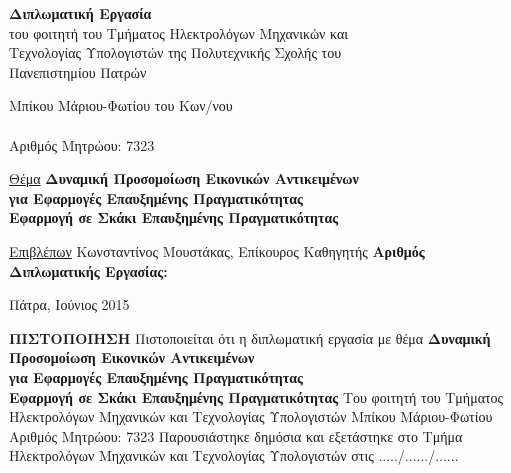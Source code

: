 \begin{center}
\LARGE\textbf{Διπλωματική Εργασία}\\
\Large
του φοιτητή του Τμήματος Ηλεκτρολόγων Μηχανικών και\\
Τεχνολογίας Υπολογιστών της Πολυτεχνικής Σχολής του\\
Πανεπιστημίου Πατρών
\end{center}
\vskip0.5cm
\begin{center}
\LARGE
Μπίκου Μάριου-Φωτίου του Κων/νου\\
~~\\
Αριθμός Μητρώου: 7323
\end{center}

\vskip1cm
\begin{center}
\LARGE
\underline{Θέμα}
\vskip0.3cm
\textbf{Δυναμική Προσομοίωση Εικονικών Αντικειμένων \\ για Εφαρμογές Επαυξημένης Πραγματικότητας}
\\
\Large 
\textbf{Εφαρμογή σε Σκάκι Επαυξημένης Πραγματικότητας}

\end{center}

\vskip1cm
\begin{center}
\Large
\underline{Επιβλέπων}
\vskip0.2cm
Κωνσταντίνος Μουστάκας, Επίκουρος Καθηγητής
\vskip1cm
\textbf{Αριθμός Διπλωματικής Εργασίας:}
\end{center}
\vfill
\centerline{
\Large Πάτρα, Ιούνιος 2015
}
\clearpage
\null\clearpage %



\begin{center}
\LARGE
\textbf{ΠΙΣΤΟΠΟΙΗΣΗ}
\vskip0.5cm
Πιστοποιείται ότι η διπλωματική εργασία με θέμα
\vskip0.5cm
\textbf{Δυναμική Προσομοίωση Εικονικών Αντικειμένων \\ για Εφαρμογές Επαυξημένης Πραγματικότητας}
\\
\Large 
\textbf{Εφαρμογή σε Σκάκι Επαυξημένης Πραγματικότητας
}
\vskip2cm
\Large
Του φοιτητή του Τμήματος Ηλεκτρολόγων Μηχανικών και Τεχνολογίας Υπολογιστών
\vskip1cm
Μπίκου Μάριου-Φωτίου\\
\vskip0.5cm
Αριθμός Μητρώου: 7323
\vskip2cm
Παρουσιάστηκε δημόσια και εξετάστηκε στο Τμήμα Ηλεκτρολόγων Μηχανικών και Τεχνολογίας Υπολογιστών στις ...../....../......
\end{center}

\vfill


